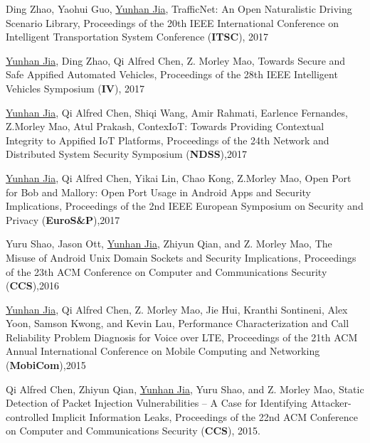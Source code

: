 \documentclass[margin]{res}
\begin{document}
\begin{resume}
Ding Zhao, Yaohui Guo, \underline{Yunhan Jia}, 
TrafficNet: An Open Naturalistic Driving Scenario Library, Proceedings of the 20th IEEE International Conference on Intelligent Transportation System Conference (\textbf{ITSC}), 2017 \href{http://web.eecs.umich.edu/\~jackjia/material/trafficnet\_itsc17.pdf}{\color{blue}{[PDF]}}

\underline{Yunhan Jia}, Ding Zhao, Qi Alfred Chen, Z. Morley Mao,
Towards Secure and Safe Appified Automated Vehicles, Proceedings of the 28th IEEE Intelligent Vehicles Symposium (\textbf{IV}), 2017 \href{https://arxiv.org/pdf/1702.06827.pdf}{\color{blue}{[PDF]}}

\underline{Yunhan Jia}, Qi Alfred Chen, Shiqi Wang, Amir Rahmati, Earlence Fernandes, Z.Morley Mao, Atul Prakash, 
ContexIoT: Towards Providing Contextual Integrity to Appified IoT Platforms, Proceedings of the 24th Network and Distributed System Security Symposium (\textbf{NDSS}),2017 \href{http://web.eecs.umich.edu/\~jackjia/material/contexiot\_ndss17.pdf}{\color{blue}{[PDF]}}

\underline{Yunhan Jia}, Qi Alfred Chen, Yikai Lin, Chao Kong, Z.Morley Mao, 
Open Port for Bob and Mallory: Open Port Usage in Android Apps and Security Implications, Proceedings of the 2nd IEEE European Symposium on Security and Privacy (\textbf{EuroS\&P}),2017 \href{http://web.eecs.umich.edu/\~jackjia/material/open\_euro17.pdf}{\color{blue}{[PDF]}}

Yuru Shao, Jason Ott, \underline{Yunhan Jia}, Zhiyun Qian, and Z. Morley Mao,
The Misuse of Android Unix Domain Sockets and Security Implications, Proceedings of the 23th ACM Conference on Computer and Communications Security (\textbf{CCS}),2016 \href{http://web.eecs.umich.edu/\~jackjia/material/misuse\_ccs16.pdf}{\color{blue}{[PDF]}}

\underline{Yunhan Jia}, Qi Alfred Chen, Z. Morley Mao, Jie Hui, Kranthi Sontineni, Alex Yoon, Samson Kwong, and Kevin Lau, 
Performance Characterization and Call Reliability Problem Diagnosis for Voice over LTE, Proceedings of the 21th ACM Annual 
International Conference on Mobile Computing and Networking (\textbf{MobiCom}),2015 \href{http://web.eecs.umich.edu/\~jackjia/material/performance\_mobicom15.pdf}{\color{blue}{[PDF]}}

Qi Alfred Chen, Zhiyun Qian, \underline{Yunhan Jia}, Yuru Shao, and Z. Morley Mao, Static Detection of Packet Injection
Vulnerabilities -- A Case for Identifying Attacker-controlled Implicit Information Leaks, Proceedings of the 22nd ACM
Conference on Computer and Communications Security (\textbf{CCS}), 2015. \href{http://web.eecs.umich.edu/\~jackjia/material/static\_ccs15.pdf}{\color{blue}{[PDF]}}


\end{resume}
\end{document}
